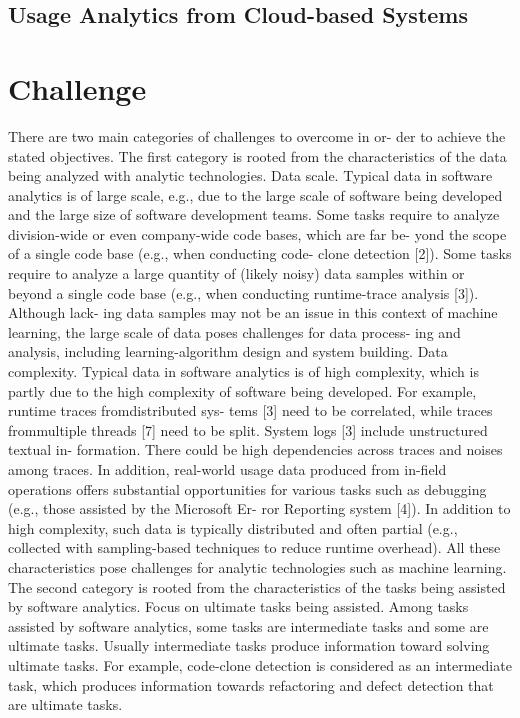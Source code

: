 \documentclass{llncs}
\begin{document}
\subsection{Usage Analytics from Cloud-based Systems}
	
\section{Challenge}

There are two main categories of challenges to overcome in or-
der to achieve the stated objectives. The first category is rooted from the characteristics of the data being analyzed with analytic technologies. Data scale. Typical data in software analytics is of large scale,
e.g., due to the large scale of software being developed and the large size of software development teams. Some tasks require to analyze division-wide or even company-wide code bases, which are far be- yond the scope of a single code base (e.g., when conducting code- clone detection [2]). Some tasks require to analyze a large quantity of (likely noisy) data samples within or beyond a single code base (e.g., when conducting runtime-trace analysis [3]). Although lack- ing data samples may not be an issue in this context of machine learning, the large scale of data poses challenges for data process- ing and analysis, including learning-algorithm design and system building. Data complexity. Typical data in software analytics is of high
complexity, which is partly due to the high complexity of software being developed. For example, runtime traces fromdistributed sys- tems [3] need to be correlated, while traces frommultiple threads [7] need to be split. System logs [3] include unstructured textual in- formation. There could be high dependencies across traces and noises among traces. In addition, real-world usage data produced from in-field operations offers substantial opportunities for various tasks such as debugging (e.g., those assisted by the Microsoft Er- ror Reporting system [4]). In addition to high complexity, such data is typically distributed and often partial (e.g., collected with sampling-based techniques to reduce runtime overhead). All these characteristics pose challenges for analytic technologies such as machine learning. The second category is rooted from the characteristics of the
tasks being assisted by software analytics. Focus on ultimate tasks being assisted. Among tasks assisted
by software analytics, some tasks are intermediate tasks and some are ultimate tasks. Usually intermediate tasks produce information toward solving ultimate tasks. For example, code-clone detection is considered as an intermediate task, which produces information towards refactoring and defect detection that are ultimate tasks.
\end{document}
